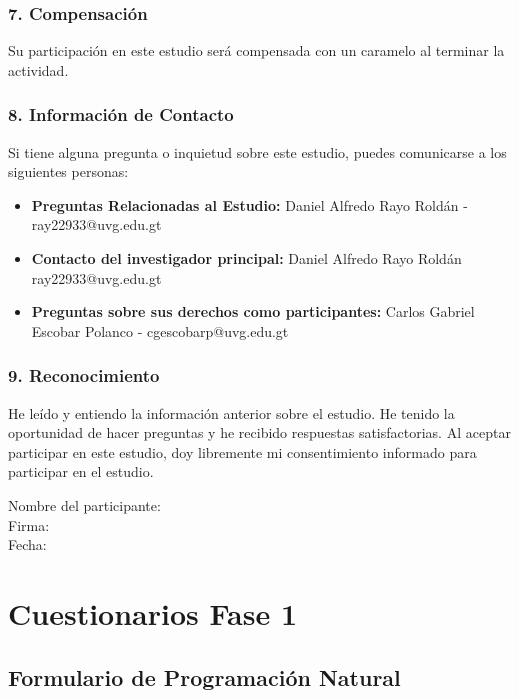 \subsubsection{7. Compensación}

\vspace{0.3em}

Su participación en este estudio será compensada con un caramelo al terminar la actividad.

\subsubsection{8. Información de Contacto}

Si tiene alguna pregunta o inquietud sobre este estudio, puedes comunicarse a los siguientes personas:

\begin{itemize}
\item \textbf{Preguntas Relacionadas al Estudio:} Daniel Alfredo Rayo Roldán - ray22933@uvg.edu.gt
\item \textbf{Contacto del investigador principal:} Daniel Alfredo Rayo Roldán ray22933@uvg.edu.gt
\item \textbf{Preguntas sobre sus derechos como participantes:} Carlos Gabriel Escobar Polanco - cgescobarp@uvg.edu.gt
\end{itemize}

\subsubsection{9. Reconocimiento}

He leído y entiendo la información anterior sobre el estudio. He tenido la oportunidad de hacer
preguntas y he recibido respuestas satisfactorias. Al aceptar participar en este estudio, doy
libremente mi consentimiento informado para participar en el estudio.

\vspace{2em}

\noindent
Nombre del participante: \lineafirma \\[1.8em]
Firma: \lineafirma \\[1.8em]
Fecha: \lineafirma

\section{Cuestionarios Fase 1}\label{Appenddix3}

\subsection{Formulario de Programación Natural}

